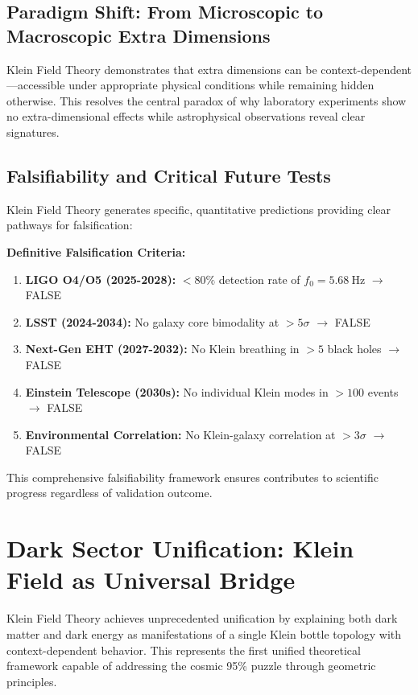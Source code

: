 \documentclass[12pt]{iopart}
\newcommand{\KFT}{\text{KFT}}
\newcommand{\fzero}{f_0}
\begin{document}
\subsection{Paradigm Shift: From Microscopic to Macroscopic Extra Dimensions}

Klein Field Theory demonstrates that extra dimensions can be context-dependent—accessible under appropriate physical conditions while remaining hidden otherwise. This resolves the central paradox of why laboratory experiments show no extra-dimensional effects while astrophysical observations reveal clear signatures.

\subsection{Falsifiability and Critical Future Tests}

Klein Field Theory generates specific, quantitative predictions providing clear pathways for falsification:

\textbf{Definitive Falsification Criteria:}
\begin{enumerate}
\item \textbf{LIGO O4/O5 (2025-2028):} $<80\%$ detection rate of $\fzero = \SI{5.68}{\hertz}$ $\rightarrow$ \KFT{} FALSE
\item \textbf{LSST (2024-2034):} No galaxy core bimodality at $>5\sigma$ $\rightarrow$ \KFT{} FALSE
\item \textbf{Next-Gen EHT (2027-2032):} No Klein breathing in $>5$ black holes $\rightarrow$ \KFT{} FALSE
\item \textbf{Einstein Telescope (2030s):} No individual Klein modes in $>100$ events $\rightarrow$ \KFT{} FALSE
\item \textbf{Environmental Correlation:} No Klein-galaxy correlation at $>3\sigma$ $\rightarrow$ \KFT{} FALSE
\end{enumerate}

This comprehensive falsifiability framework ensures \KFT{} contributes to scientific progress regardless of validation outcome.

\section{Dark Sector Unification: Klein Field as Universal Bridge}

Klein Field Theory achieves unprecedented unification by explaining both dark matter and dark energy as manifestations of a single Klein bottle topology with context-dependent behavior. This represents the first unified theoretical framework capable of addressing the cosmic 95\% puzzle through geometric principles.
\end{document}
